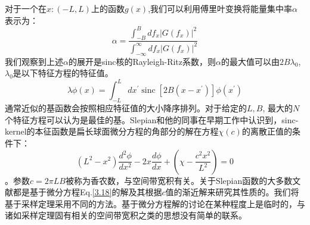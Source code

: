 \documentclass[10pt, UTF8]{ctexart}%
\newcommand{\InsertEqution}[2]{\begin{equation}
  \label{#1}
   #2
 \end{equation}}
\newcommand{\RefEq}[1]{Eq.\ref{#1}}
\newcommand{\InsertInlineEq}[1]{$#1$}
\begin{document}
\begin{sloppypar}
对于一个在\InsertInlineEq{x:(-L,L)}上的函数\InsertInlineEq{g(x)},我们可以利用傅里叶变换将能量集中率\InsertInlineEq{\alpha}表示为：\InsertEqution{3.16}{\alpha=\frac{\int_{-B}^{B} d f_{x}\left|G\left(f_{x}\right)\right|^{2}}{\int_{-\infty}^{\infty} d f_{x}\left|G\left(f_{x}\right)\right|^{2}}}
我们观察到上述\InsertInlineEq{\alpha}的展开是sinc核的Rayleigh-Ritz系数，则\InsertInlineEq{\alpha}的最大值可以由\InsertInlineEq{2B\lambda_0},\InsertInlineEq{\lambda_0}是以下特征方程的特征值。\InsertEqution{3.17}{\lambda \phi(x)=\int_{-L}^{L} d x^{\prime} \operatorname{sinc}\left[2 B\left(x-x^{\prime}\right)\right] \phi\left(x^{\prime}\right)}通常近似的基函数会按照相应特征值的大小降序排列。对于给定的\InsertInlineEq{L,B}, 最大的\InsertInlineEq{N}个特征方程可以认为是最佳的基。Slepian和他的同事在早期工作中认识到，sinc-kernel的本征函数是扁长球面微分方程的角部分的解在方程\InsertInlineEq{\chi(c)}的离散正值的条件下：\InsertEqution{3.18}{\left(L^{2}-x^{2}\right) \frac{d^{2} \phi}{d x^{2}}-2 x \frac{d \phi}{d x}+\left(\chi-\frac{c^{2} x^{2}}{L^{2}}\right)=0}。参数\InsertInlineEq{c=2\pi LB}被称为香农数，与空间带宽积有关。关于Slepian函数的大多数文献都是基于微分方程\RefEq{3.18}的解及其根据\InsertInlineEq{c}值的渐近解来研究其性质的。我们将基于采样定理采用不同的方法。基于微分方程解的讨论在某种程度上是临时的，与诸如采样定理固有相关的空间带宽积之类的思想没有简单的联系。


\end{sloppypar}
\end{document}
